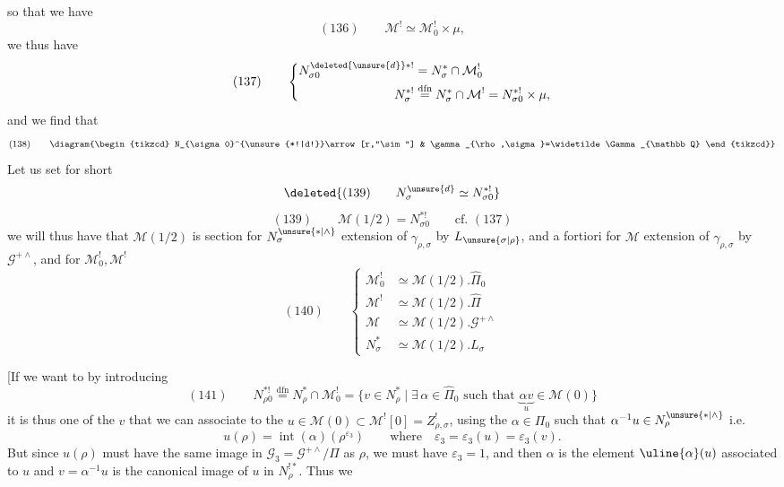 so that we have
\[
 (136)\qquad \mathcal M^!\simeq\mathcal M_0^!\times\mu,
\]
we thus have
\[
 (137)\qquad
 \left\{\begin{aligned}
 N_{\sigma0}^{\deleted{\unsure{d}}*!}&=N^*_{\sigma}\cap\mathcal M_0^!\\
 N_{\sigma}^{*!}&\overset{\mathrm{dfn}}{=}N^*_{\sigma}\cap\mathcal M^!
                    =N_{\sigma0}^{*!}\times\mu,
 \end{aligned}\right.
\]
and we find that
\[
 (138)\qquad
 \diagram{\begin{tikzcd}
 N_{\sigma0}^{\unsure{*!|d!}}\arrow[r,"\sim"] &
 \gamma_{\rho,\sigma}=\widetilde\Gamma_{\mathbb Q}
 \end{tikzcd}}
\]
 Let us set for short
\[
 \deleted{(139)\qquad N_{\sigma}^{\unsure{d}}\simeq N_{\sigma0}^{*!}}
\]
\[
 (139)\qquad \mathcal M(1/2)=N_{\sigma0}^{*!}\qquad\text{cf. }(137)
\]
we will thus have that $\mathcal M(1/2)$ is 
section
 for $N_{\sigma}^{\unsure{*|\wedge}}$ extension of
$\gamma_{\rho,\sigma}$ by $L_{\unsure{\sigma|\rho}}$, and a fortiori for
$\mathcal M$ extension of $\gamma_{\rho,\sigma}$ by $\mathcal G^{+\wedge}$,
and    for
$\mathcal M_0^!,\mathcal M^!$
\[
 (140)\qquad
 \left\{\begin{aligned}
 \mathcal M_0^!&\simeq\mathcal M(1/2).\widehat\Pi_0\\
 \mathcal M^!&\simeq\mathcal M(1/2).\widehat\Pi\\
 \mathcal M&\simeq\mathcal M(1/2).\mathcal G^{+\wedge}\\
 N^*_{\sigma}&\simeq\mathcal M(1/2).L_{\sigma}
 \end{aligned}\right.
\]

[If we want to  by introducing
\[
 (141)\qquad
 N_{\rho0}^{*!}\overset{\mathrm{dfn}}{=}N^*_{\rho}\cap\mathcal M_0^!
 =\{v\in N^*_{\rho}\mid\exists\,\alpha\in\widehat\Pi_0\text{ such that }
       \underbrace{\alpha v}_{u}\in\mathcal M(0)\}
\]
it is thus one of the $v$ that we can associate to the
$u\in\mathcal M(0)\subset\mathcal M^![0]=Z^!_{\rho,\sigma}$,
using the $\alpha\in\Pi_0$ such that
$\alpha^{-1}u\in N_{\rho}^{\unsure{*|\wedge}}$ i.e.
\[
 u(\rho)=\operatorname{int}(\alpha)(\rho^{\varepsilon_3})
 \qquad\text{where}\quad\varepsilon_3=\varepsilon_3(u)=\varepsilon_3(v).
\]
But since $u(\rho)$ must have the same image in
$\mathcal G_3=\mathcal G^{+\wedge}/\Pi$
as $\rho$, we must have $\varepsilon_3=1$, and then
$\alpha$ is the element $\uline{\alpha}(u)$ associated to $u$ and
$v=\alpha^{-1}u$ is the canonical image of $u$ in $N^{!*}_{\rho}$. Thus we

